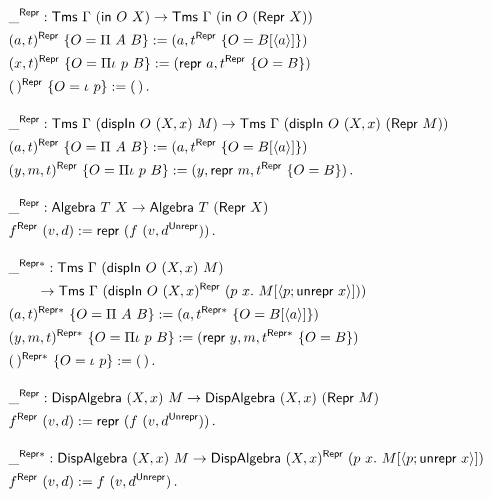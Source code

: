 \begin{fleqn}
\begin{align*}
&\_^{\mta{Repr}} : \Tms\ \Gamma\ (\mta{in}\ O\ X) \to \Tms\ \Gamma\ (\mta{in}\ O\ (\mta{Repr}\ X)) \\
&(a, t)^{\mta{Repr}}\ \{O = \Pi\ A\ B\} := (a, t^\mta{Repr}\ \{O = B[\Msub a]\}) \\
&(x, t)^{\mta{Repr}}\ \{O = \Pi\iota\ p\ B\} := (\mta{repr}\ a, t^\mta{Repr}\ \{O = B\}) \\
&(\,)^{\mta{Repr}}\ \{O = \iota\ p\} := (\,) \,. \\[1em]
&\_^{\mta{Repr}} : \Tms\ \Gamma\ (\mta{dispIn}\ O\ (X, x)\ M) \to \Tms\ \Gamma\ (\mta{dispIn}\ O\ (X, x)\ (\mta{Repr}\ M)) \\
&(a, t)^{\mta{Repr}}\ \{O = \Pi\ A\ B\} := (a, t^\mta{Repr}\ \{O = B[\Msub a]\}) \\
&(y, m, t)^{\mta{Repr}}\ \{O = \Pi\iota\ p\ B\} := (y, \mta{repr}\ m, t^\mta{Repr}\ \{O = B\}) \,. \\[1em]
&\_^{\mta{Repr}} : \mta{Algebra}\ T\ X \to \mta{Algebra}\ T\ (\mta{Repr}\ X) \\
&f^{\mta{Repr}}\ (v, d) := \mta{repr}\ (f\ (v, d^{\mta{Unrepr}})) \,. \\[1em]
&\_^{\mta{Repr}*} : \Tms\ \Gamma\ (\mta{dispIn}\ O\ (X, x)\ M) \\ & \qquad \to \Tms\ \Gamma\ (\mta{dispIn}\ O\ (X, x)^{\mta{Repr}}\ (p\ x .\ M[\Msub{p;\mta{unrepr}\ x}])) \\
&(a, t)^{\mta{Repr}*}\ \{O = \Pi\ A\ B\} := (a, t^{\mta{Repr}*}\ \{O = B[\Msub a]\}) \\
&(y, m, t)^{\mta{Repr}*}\ \{O = \Pi\iota\ p\ B\} := (\mta{repr}\ y, m, t^{\mta{Repr}*}\ \{O = B\}) \\
&(\,)^{\mta{Repr}*}\ \{O = \iota\ p\} := (\,) \,. \\[1em]
&\_^{\mta{Repr}} : \mta{DispAlgebra}\ (X, x)\ M \to \mta{DispAlgebra}\ (X, x)\ (\mta{Repr}\ M) \\
&f^{\mta{Repr}}\ (v, d) := \mta{repr}\ (f\ (v, d^{\mta{Unrepr}})) \,. \\[1em]
&\_^{\mta{Repr}*} : \mta{DispAlgebra}\ (X, x)\ M \to \mta{DispAlgebra}\ (X, x)^{\mta{Repr}}\ (p\ x .\ M[\Msub{p;\mta{unrepr}\ x}]) \\
&f^{\mta{Repr}}\ (v, d) := f\ (v, d^{\mta{Unrepr}}) \,.
\end{align*}
\end{fleqn}
